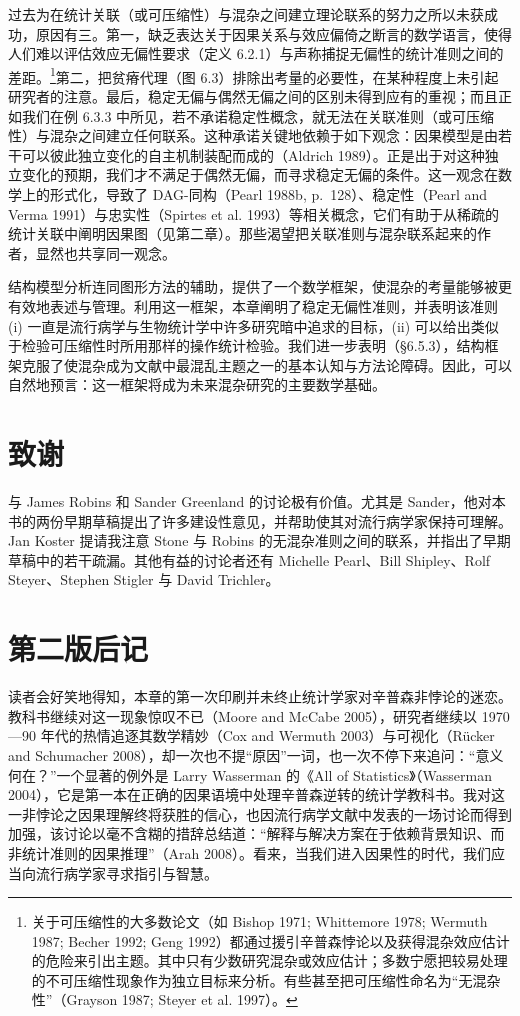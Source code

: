 过去为在统计关联（或可压缩性）与混杂之间建立理论联系的努力之所以未获成功，原因有三。第一，缺乏表达关于因果关系与效应偏倚之断言的数学语言，使得人们难以评估效应无偏性要求（定义 6.2.1）与声称捕捉无偏性的统计准则之间的差距。\footnote{关于可压缩性的大多数论文（如 Bishop 1971; Whittemore 1978; Wermuth 1987; Becher 1992; Geng 1992）都通过援引辛普森悖论以及获得混杂效应估计的危险来引出主题。其中只有少数研究混杂或效应估计；多数宁愿把较易处理的不可压缩性现象作为独立目标来分析。有些甚至把可压缩性命名为“无混杂性”（Grayson 1987; Steyer et al. 1997）。}第二，把贫瘠代理（图 6.3）排除出考量的必要性，在某种程度上未引起研究者的注意。最后，稳定无偏与偶然无偏之间的区别未得到应有的重视；而且正如我们在例 6.3.3 中所见，若不承诺稳定性概念，就无法在关联准则（或可压缩性）与混杂之间建立任何联系。这种承诺关键地依赖于如下观念：因果模型是由若干可以彼此独立变化的自主机制装配而成的（Aldrich 1989）。正是出于对这种独立变化的预期，我们才不满足于偶然无偏，而寻求稳定无偏的条件。这一观念在数学上的形式化，导致了 DAG-同构（Pearl 1988b, p.~128）、稳定性（Pearl and Verma 1991）与忠实性（Spirtes et al. 1993）等相关概念，它们有助于从稀疏的统计关联中阐明因果图（见第二章）。那些渴望把关联准则与混杂联系起来的作者，显然也共享同一观念。

结构模型分析连同图形方法的辅助，提供了一个数学框架，使混杂的考量能够被更有效地表述与管理。利用这一框架，本章阐明了稳定无偏性准则，并表明该准则 (i) 一直是流行病学与生物统计学中许多研究暗中追求的目标，(ii) 可以给出类似于检验可压缩性时所用那样的操作统计检验。我们进一步表明（\S 6.5.3），结构框架克服了使混杂成为文献中最混乱主题之一的基本认知与方法论障碍。因此，可以自然地预言：这一框架将成为未来混杂研究的主要数学基础。

\section*{致谢}

与 James Robins 和 Sander Greenland 的讨论极有价值。尤其是 Sander，他对本书的两份早期草稿提出了许多建设性意见，并帮助使其对流行病学家保持可理解。Jan Koster 提请我注意 Stone 与 Robins 的无混杂准则之间的联系，并指出了早期草稿中的若干疏漏。其他有益的讨论者还有 Michelle Pearl、Bill Shipley、Rolf Steyer、Stephen Stigler 与 David Trichler。

\section*{第二版后记}

读者会好笑地得知，本章的第一次印刷并未终止统计学家对辛普森非悖论的迷恋。教科书继续对这一现象惊叹不已（Moore and McCabe 2005），研究者继续以 1970—90 年代的热情追逐其数学精妙（Cox and Wermuth 2003）与可视化（Rücker and Schumacher 2008），却一次也不提“原因”一词，也一次不停下来追问：“意义何在？”一个显著的例外是 Larry Wasserman 的《All of Statistics》（Wasserman 2004），它是第一本在正确的因果语境中处理辛普森逆转的统计学教科书。我对这一非悖论之因果理解终将获胜的信心，也因流行病学文献中发表的一场讨论而得到加强，该讨论以毫不含糊的措辞总结道：“解释与解决方案在于依赖背景知识、而非统计准则的因果推理”（Arah 2008）。看来，当我们进入因果性的时代，我们应当向流行病学家寻求指引与智慧。
